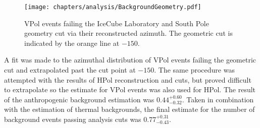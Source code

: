 \begin{figure}
  \texttt{[image: chapters/analysis/BackgroundGeometry.pdf]}
  \caption{VPol events failing the IceCube Laboratory and South Pole geometry cut via their reconstructed azimuth. The geometric cut is indicated by the orange line at $-150$.}
  \label{fig:Analysis:Background-Estimation:Anthropogenic-Background}
\end{figure}

A fit was made to the azimuthal distribution of VPol events failing the geometric cut and extrapolated past the cut point at $-150$. The same procedure was attempted with the results of HPol reconstruction and cuts, but proved difficult to extrapolate so the estimate for VPol events was also used for HPol. The result of the anthropogenic background estimation was $0.44^{+0.60}_{-0.32}$. Taken in combination with the estimation of thermal backgrounds, the final estimate for the number of background events passing analysis cuts was $0.77^{+0.31}_{-0.43}$.


